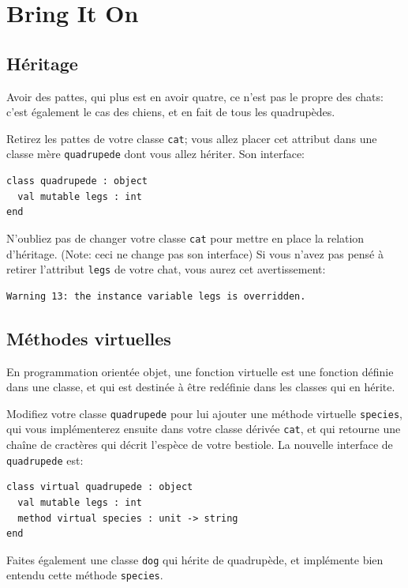 \documentclass[a4paper]{article}
\begin{document}
\section{Bring It On}

\subsection{Héritage}

Avoir des pattes, qui plus est en avoir quatre, ce n'est pas le propre des
chats: c'est également le cas des chiens, et en fait de tous les quadrupèdes.

Retirez les pattes de votre classe \verb|cat|; vous allez placer cet attribut
dans une classe mère \verb|quadrupede| dont vous allez hériter. Son interface:

\begin{verbatim}
class quadrupede : object
  val mutable legs : int
end
\end{verbatim}

N'oubliez pas de changer votre classe \verb|cat| pour mettre en place la
relation d'héritage. (Note: ceci ne change pas son interface) Si vous n'avez
pas pensé à retirer l'attribut \verb|legs| de votre chat, vous aurez cet
avertissement:

\begin{verbatim}
Warning 13: the instance variable legs is overridden.
\end{verbatim}

\subsection{Méthodes virtuelles}

En programmation orientée objet, une fonction virtuelle est une fonction
définie dans une classe, et qui est destinée à être redéfinie dans les
classes qui en hérite.

Modifiez votre classe \verb|quadrupede| pour lui ajouter une méthode virtuelle
\verb|species|, qui vous implémenterez ensuite dans votre classe dérivée
\verb|cat|, et qui retourne une chaîne de cractères qui décrit l'espèce de
votre bestiole. La nouvelle interface de \verb|quadrupede| est:

\begin{verbatim}
class virtual quadrupede : object
  val mutable legs : int
  method virtual species : unit -> string
end
\end{verbatim}

Faites également une classe \verb|dog| qui hérite de quadrupède, et implémente
bien entendu cette méthode \verb|species|.
\end{document}
